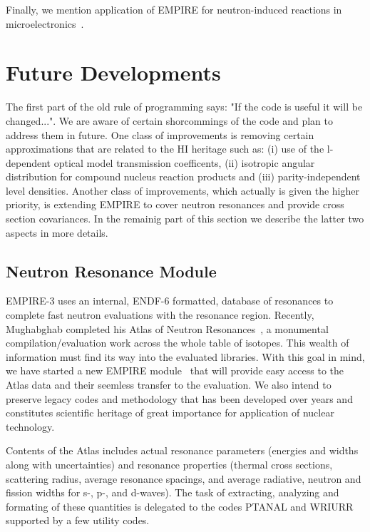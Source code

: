 \documentclass[twocolumn,amsmath,amssymb,10pt,groupedaddress,a4paper]{revtex4}
\begin{document}
Finally, we mention application of EMPIRE  for neutron-induced reactions in microelectronics~\cite{wrobel2005unc}.



\section{Future Developments}

The first part of the old rule of programming says: "If the code is useful it will be changed...". We are aware of certain shorcommings of the code and plan to address them in future.  One class of improvements is removing certain approximations that are related to the HI heritage such as: (i) use of the l-dependent optical model transmission coefficents, (ii) isotropic angular distribution for compound nucleus reaction products and (iii) parity-independent level densities. Another class of improvements, which actually is given the higher priority, is extending EMPIRE to cover neutron resonances and provide cross section covariances. In the remainig part of this section we describe the latter two aspects in more details.

\subsection{Neutron Resonance Module}
EMPIRE-3 uses an internal, ENDF-6 formatted, database of resonances to complete fast neutron evaluations with the resonance region. Recently,  Mughabghab completed his Atlas of Neutron Resonances~\cite{Mughabghab:06}, a monumental compilation/evaluation work across the whole table of isotopes. This wealth of information must find its way into the evaluated libraries. With this goal in mind, we have started a new EMPIRE module~\cite{Cho:07} that will provide easy access to the Atlas data and their seemless transfer to the evaluation. We also intend to preserve legacy codes and methodology that has been developed over years and constitutes scientific heritage of great importance for application of nuclear technology.

Contents of the Atlas includes actual resonance parameters (energies and widths along with uncertainties) and resonance properties  (thermal cross sections, scattering radius, average resonance spacings, and average radiative, neutron and fission widths for s-, p-, and d-waves). The task of extracting, analyzing and formating of these quantities is delegated to the codes PTANAL and WRIURR~\cite{Oh:00} supported by a few utility codes.
\end{document}
